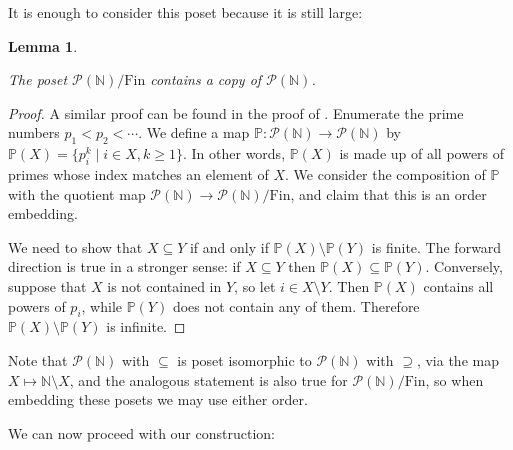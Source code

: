 \documentclass[reqno,12pt]{amsart}\setcounter{tocdepth}{1}
\newtheorem{lemma}[theorem]{Lemma}
\theoremstyle{definition}
\newcommand{\N}{\mathbb{N}}
\numberwithin{equation}{section}
\begin{document}
It is enough to consider this poset because it is still large:

\begin{lemma}
\label{lem:PtildeN}

The poset $\mathcal{P}(\N)/\mathrm{Fin}$ contains a copy of $\mathcal{P}(\N)$.
\end{lemma}

\begin{proof}
A similar proof can be found in the proof of \cite[Proposition~6.1]{ABO}. Enumerate the prime numbers $ p_1 < p_2 < \cdots$. We define a map $\mathbb{P} \colon \mathcal{P}(\N) \to \mathcal{P}(\N)$ by $\mathbb{P}(X) = \{ p_i^k \mid i \in X, k \geq 1 \}$. In other words, $\mathbb{P}(X)$ is made up of all powers of primes whose index matches an element of $X$. We consider the composition of $\mathbb{P}$ with the quotient map $\mathcal{P}(\N) \to \mathcal{P}(\N)/\mathrm{Fin}$, and claim that this is an order embedding.

We need to show that $X \subseteq Y$ if and only if $\mathbb{P}(X) \setminus \mathbb{P}(Y)$ is finite. The forward direction is true in a stronger sense: if $X \subseteq Y$ then $\mathbb{P}(X) \subseteq \mathbb{P}(Y)$. Conversely, suppose that $X$ is not contained in $Y$, so let $i \in X \setminus Y$. Then $\mathbb{P}(X)$ contains all powers of $p_i$, while $\mathbb{P}(Y)$ does not contain any of them. Therefore $\mathbb{P}(X) \setminus \mathbb{P}(Y)$ is infinite.
\end{proof}

Note that $\mathcal{P}(\N)$ with $\subseteq$ is poset isomorphic to $\mathcal{P}(\N)$ with $\supseteq$, via the map $X\mapsto \N\setminus X$, and the analogous statement is also true for $\mathcal{P}(\N)/\mathrm{Fin}$, so when embedding these posets we may use either order.

We can now proceed with our construction:
\end{document}
